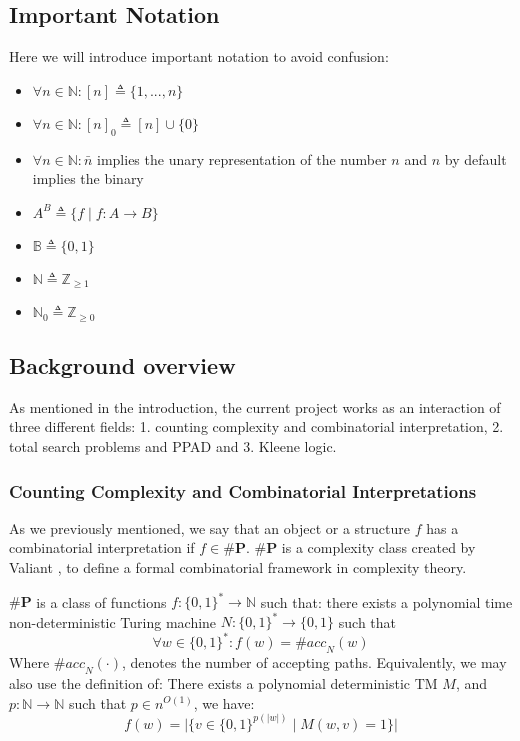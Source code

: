


\subsection{Important Notation}

Here we will introduce important notation to avoid confusion:
\begin{itemize}
    \item $\forall n \in \mathbb{N}: [n] \triangleq \{1, ..., n\}$
    \item $\forall n \in \mathbb{N}: [n]_0 \triangleq [n] \cup \{0\}$
    \item $\forall n \in \mathbb{N}: \bar{n}$ implies the unary representation of the number $n$ and $n$ by default implies the binary
    \item $A^B \triangleq \{f \mid f: A \to B\}$
    \item $\mathbb{B} \triangleq \{0,1\}$
    \item $\mathbb{N} \triangleq \mathbb{Z}_{\geq 1}$
    \item $\mathbb{N}_0 \triangleq \mathbb{Z}_{\geq 0}$
\end{itemize}

\subsection{Background overview}
As mentioned in the introduction, the current project works as an interaction
of three different fields: 1. counting complexity and combinatorial interpretation, 
2. total search problems and PPAD and 3. Kleene logic.


\subsubsection{Counting Complexity and Combinatorial Interpretations}
As we previously mentioned, we say that an object or a structure $f$
has a combinatorial interpretation if $f \in \textbf{\#P}$. $\textbf{\#P}$
is a complexity class created by Valiant \cite{valiantComplexityComputingPermanent1979},
to define a formal combinatorial framework in complexity theory.


\begin{definition}
    $\textbf{\#P}$ is a class of functions $f: \{0,1\}^* \to \mathbb{N}$
    such that: there exists a polynomial time non-deterministic
    Turing machine $N: \{0,1\}^* \to \{0,1\}$ such that
    $$
    \forall w \in \{0,1\}^*: f(w) = \textit{\#acc}_N(w)
    $$
    Where $\textit{\#acc}_N(\cdot)$, denotes the number of accepting paths.
    Equivalently, we may also use the definition of: There
    exists a polynomial deterministic TM $M$, and
    $p : \mathbb{N} \to \mathbb{N}$ such that $p \in n^{O(1)}$, we have:
    $$
    f(w) = \Big|\Big\{v \in \{0,1\}^{p(|w|)} \mid M(w, v) =1 \Big\}\Big|
    $$
\end{definition}

